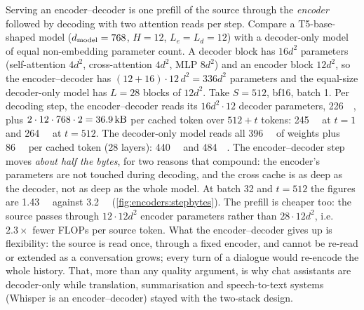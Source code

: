\begin{systemslens}
Serving an encoder--decoder is one prefill of the source through the \emph{encoder} followed by
decoding with two attention reads per step. Compare a T5-base-shaped model ($d_{\text{model}}=768$, $H=12$,
$L_e=L_d=12$) with a decoder-only model of equal non-embedding parameter count. A decoder block has
$16d^2$ parameters (self-attention $4d^2$, cross-attention $4d^2$, MLP $8d^2$) and an encoder block
$12d^2$, so the encoder--decoder has $(12+16)\cdot12\,d^2=336d^2$ parameters and the equal-size
decoder-only model has $L=28$ blocks of $12d^2$. Take $S=512$, bf16, batch 1. Per decoding step, the
encoder--decoder reads its $16d^2\cdot12$ decoder parameters, \SI{226}{\mega\byte}, plus
$2\cdot12\cdot768\cdot2=\SI{36.9}{\kilo\byte}$ per cached token over $512+t$ tokens:
\SI{245}{\mega\byte} at $t=1$ and \SI{264}{\mega\byte} at $t=512$. The decoder-only model reads all
\SI{396}{\mega\byte} of weights plus \SI{86}{\kilo\byte} per cached token (28 layers):
\SI{440}{\mega\byte} and \SI{484}{\mega\byte}. The encoder--decoder step moves \emph{about half the
bytes}, for two reasons that compound: the encoder's parameters are not touched during decoding, and
the cross cache is as deep as the decoder, not as deep as the whole model. At batch 32 and $t=512$
the figures are \SI{1.43}{\giga\byte} against \SI{3.2}{\giga\byte} (\cref{fig:encoders:stepbytes}).
The prefill is cheaper too: the source passes through $12\cdot12d^2$ encoder parameters rather than
$28\cdot12d^2$, i.e.\ $2.3\times$ fewer FLOPs per source token. What the encoder--decoder gives up is
flexibility: the source is read once, through a fixed encoder, and cannot be re-read or extended as a
conversation grows; every turn of a dialogue would re-encode the whole history. That, more than any
quality argument, is why chat assistants are decoder-only while translation, summarisation and
speech-to-text systems (Whisper is an encoder--decoder) stayed with the two-stack design.
\end{systemslens}

